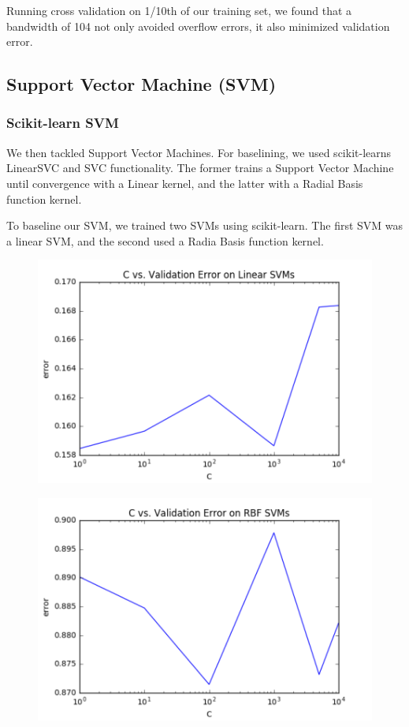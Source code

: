 \documentclass{article} %
\begin{document}
Running cross validation on 1/10th of our training set, we found that a
bandwidth of 104 not only avoided overflow errors, it also minimized validation error.

\subsection{Support Vector Machine (SVM)}
\subsubsection{Scikit-learn SVM}
We then tackled Support Vector Machines. For baselining,
we used scikit-learns LinearSVC and SVC functionality. The
former trains a Support Vector Machine until convergence with
a Linear kernel, and the latter with a Radial Basis function kernel. 

To baseline our SVM, we trained two SVMs using scikit-learn. The first SVM was a
linear SVM, and the second used a Radia Basis function kernel.

\begin{figure}[h]
\includegraphics[width=\textwidth]{sklearn-svm-c-cv.png}
\end{figure}

\begin{figure}[h]
\includegraphics[width=\textwidth]{sklearn-svm-kernel-c-cv.png}
\end{figure}
\end{document}
